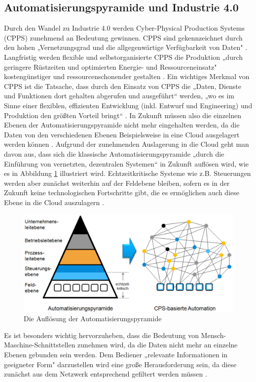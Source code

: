 \subsection{Automatisierungspyramide und Industrie 4.0}\label{sec:AutomatisierungspyramideUndIndustrie4.0}
Durch den Wandel zu Industrie 4.0 werden Cyber-Physical Production Systems (CPPS) zunehmend an Bedeutung gewinnen. CPPS sind gekennzeichnet durch den hohen „Vernetzungsgrad und die allgegenwärtige Verfügbarkeit von Daten" \cite[S.3]{17}. Langfristig werden flexible und selbstorganisierte CPPS die Produktion „durch geringere Rüstzeiten und optimierten Energie- und Ressourceneinsatz" \cite[S.3]{17} kostengünstiger und ressourcenschonender gestalten \cite[S.3]{17}.
\newpage
\noindent Ein wichtiges Merkmal von CPPS ist die Tatsache, dass durch den Einsatz von CPPS die „Daten, Dienste und Funktionen dort gehalten abgerufen und ausgeführt“ \cite[S.4]{17} werden, „wo es im Sinne einer flexiblen, effizienten Entwicklung (inkl. Entwurf und Engineering) und Produktion den größten Vorteil bringt“ \cite[S.4]{17}. In Zukunft müssen also die einzelnen Ebenen der Automatisierungspyramide nicht mehr eingehalten werden, da die Daten von den verschiedenen Ebenen Beispielsweise in eine Cloud ausgelagert werden können \cite[S.4]{17}.
\newline
Aufgrund der zunehmenden Auslagerung in die Cloud geht man davon aus, dass sich die klassische Automatisierungspyramide „durch die Einführung von vernetzten, dezentralen Systemen“ \cite[S.4]{17} in Zukunft auflösen wird, wie es in Abbildung \ref{fig:AutomatisierungspyramideCPPS} illustriert wird. Echtzeitkritische Systeme wie z.B. Steuerungen werden aber zunächst weiterhin auf der Feldebene bleiben, sofern es in der Zukunft keine technologischen Fortschritte gibt, die es ermöglichen auch diese Ebene in die Cloud auszulagern \cite[S.4]{17}.
\begin{figure}[h]
	\centering
	\includegraphics[width=1\linewidth]{Bilder/A10_AutomatisierungspyramideCPPS}
	\caption{Die Auflösung der Automatisierungspyramide \cite[S.4]{17}}
	\label{fig:AutomatisierungspyramideCPPS}
\end{figure}
\newline
\noindent Es ist besonders wichtig hervorzuheben, dass die Bedeutung von Mensch-Maschine-Schnittstellen zunehmen wird, da die Daten nicht mehr an einzelne Ebenen gebunden sein werden. Dem Bediener „relevante Informationen in geeigneter Form" \cite[S.4]{17} darzustellen wird eine große Herausforderung sein, da diese zunächst aus dem Netzwerk entsprechend gefiltert werden müssen \cite[S.4]{17}.


